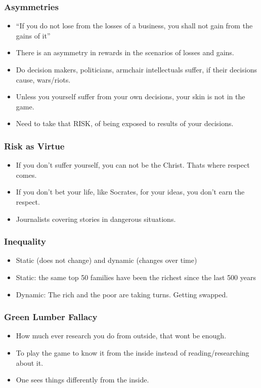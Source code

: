 \begin{frame}[fragile]\frametitle{Asymmetries}

\begin{itemize}
\item ``If you do not lose from the losses of a business, you shall not gain from the gains of it''
\item There is an asymmetry in rewards in the scenarios of losses and gains.
\item Do decision makers, politicians, armchair intellectuals suffer, if their decisions cause, wars/riots.
\item Unless you yourself suffer from your own decisions, your skin is not in the game.
\item Need to take that RISK, of being exposed to results of your decisions.
\end{itemize}
\end{frame}

\begin{frame}[fragile]\frametitle{Risk as Virtue}

\begin{itemize}
\item If you don't suffer yourself, you can not be the Christ. Thats where respect comes.
\item If you don't bet your life, like Socrates, for your ideas, you don't earn the respect.
\item Journalists covering stories in dangerous situations.
\end{itemize}
\end{frame}



\begin{frame}[fragile]\frametitle{Inequality}

\begin{itemize}
\item Static (does not change) and dynamic (changes over time)
\item Static: the same top 50 families have been the richest since the last 500 years
\item Dynamic: The rich and the poor are taking turns. Getting swapped.
\end{itemize}
\end{frame}


\begin{frame}[fragile]\frametitle{Green Lumber Fallacy}

\begin{itemize}
\item How much ever research you do from outside, that wont be enough.
\item To play the game to know it from the inside instead of reading/researching about it. 
\item One sees things differently from the inside.
\end{itemize}
\end{frame}

